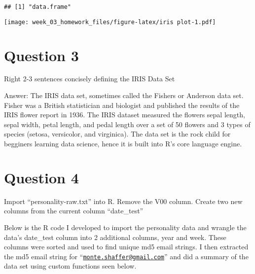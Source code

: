 \documentclass{article}
\begin{document}
\begin{verbatim}
## [1] "data.frame"
\end{verbatim}

\texttt{[image: week\_03\_homework\_files/figure-latex/iris plot-1.pdf]}

\newpage

\hypertarget{question-3}{%
\section{\texorpdfstring{\textbf{Question
3}}{Question 3}}\label{question-3}}

Right 2-3 sentences concisely defining the IRIS Data Set

Answer: The IRIS data set, sometimes called the Fishers or Anderson data
set. Fisher was a British statistician and biologist and published the
results of the IRIS flower report in 1936. The IRIS dataset measured the
flowers sepal length, sepal width, petal length, and pedal length over a
set of 50 flowers and 3 types of species (setosa, versicolor, and
virginica). The data set is the rock child for begginers learning data
science, hence it is built into R's core language engine.

\newpage

\hypertarget{question-4}{%
\section{Question 4}\label{question-4}}

Import ``personality-raw.txt'' into R. Remove the V00 column. Create two
new columns from the current column ``date\_test''

Below is the R code I developed to import the personality data and
wrangle the data's date\_test column into 2 additional columns, year and
week. These columns were sorted and used to find unique md5 email
strings. I then extracted the md5 email string for
``\href{mailto:monte.shaffer@gmail.com}{\nolinkurl{monte.shaffer@gmail.com}}''
and did a summary of the data set using custom functions seen below.
\end{document}
